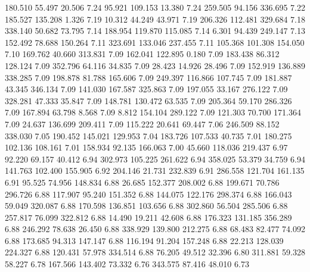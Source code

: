  180.510   55.497   20.506         7.24
  95.921  109.153   13.380         7.24
 259.505   94.156  336.695         7.22
 185.527  135.208    1.326         7.19
  10.312   44.249   43.971         7.19
 206.326  112.481  329.684         7.18
 338.140   50.682   73.795         7.14
 188.954  119.870  115.085         7.14
   6.301   94.439  249.147         7.13
 152.492   78.688  150.264         7.11
 323.691  133.046  237.455         7.11
 105.368  101.308  154.050         7.10
 169.762   40.660  313.831         7.09
 162.041  122.895    0.180         7.09
 183.438   86.312  128.124         7.09
 352.796   64.116   34.835         7.09
  28.423   14.926   28.496         7.09
 152.919  136.889  338.285         7.09
 198.878   81.788  165.606         7.09
 249.397  116.866  107.745         7.09
 181.887   43.345  346.134         7.09
 141.030  167.587  325.863         7.09
 197.055   33.167  276.122         7.09
 328.281   47.333   35.847         7.09
 148.781  130.472   63.535         7.09
 205.364   59.170  286.326         7.09
 167.894   63.798    8.568         7.09
   8.812  154.104  289.122         7.09
 121.303   70.700  171.364         7.09
  24.637  136.699  209.411         7.09
 115.222   20.641   69.447         7.06
 246.509   88.152  338.030         7.05
 190.452  145.021  129.953         7.04
 183.726  107.533   40.735         7.01
 180.275  102.136  108.161         7.01
 158.934   92.135  166.063         7.00
  45.660  118.036  219.437         6.97
  92.220   69.157   40.412         6.94
 302.973  105.225  261.622         6.94
 358.025   53.379   34.759         6.94
 141.763  102.400  155.905         6.92
 204.146   21.731  232.839         6.91
 286.558  121.704  161.135         6.91
  95.525   74.956  148.834         6.88
  26.685  152.377  208.002         6.88
 199.671   70.786  296.726         6.88
 117.907   95.240  151.352         6.88
 144.075  122.176  298.374         6.88
 166.043   59.049  320.087         6.88
 170.598  136.851  103.656         6.88
 302.860   56.504  285.506         6.88
 257.817   76.099  322.812         6.88
  14.490   19.211   42.608         6.88
 176.323  131.185  356.289         6.88
 246.292   78.638   26.450         6.88
 338.929  139.800  212.275         6.88
  68.483   82.477   74.092         6.88
 173.685   94.313  147.147         6.88
 116.194   91.204  157.248         6.88
  22.213  128.039  224.327         6.88
 120.431   57.978  334.514         6.88
  76.205   49.512   32.396         6.80
 311.881   59.328   58.227         6.78
 167.566  143.402   73.332         6.76
 343.575   87.416   48.010         6.73
